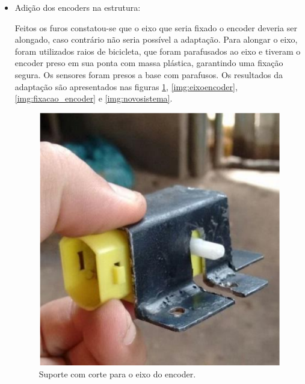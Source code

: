 \begin{itemize}
   	  \item Adição dos encoders na estrutura:


   		Feitos os furos constatou-se que o eixo que seria fixado o encoder deveria ser alongado, caso contrário não seria possível a adaptação. Para alongar o eixo, foram utilizados raios de bicicleta, que foram parafusados ao eixo e tiveram o encoder preso em sua ponta com massa plástica, garantindo uma fixação segura. Os sensores foram presos a base com parafusos. Os resultados da adaptação são apresentados nas figuras \ref{img:encoder1}, \ref{img:eixoencoder}, \ref{img:fixacao_encoder} e \ref{img:novosistema}.

   		\begin{figure}[H]                                                           
            \centering                                                                
            \includegraphics[scale=0.5]{figuras/encoder1.png}               
            \caption{Suporte com corte para o eixo do encoder.}    
            \label{img:encoder1}                                            
         \end{figure}


\end{itemize}
